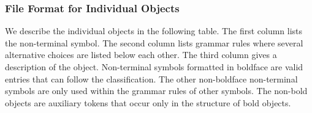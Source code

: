\subsubsection{File Format for Individual Objects\label{grammar}}

We describe the individual objects in the following table. The first
column lists the non-terminal symbol. The second column lists grammar
rules where several alternative choices are listed below each other.
The third column gives a description of the object.  Non-terminal
symbols formatted in boldface are valid  entries that can
follow the classification. The other non-boldface non-terminal symbols
are only used within the grammar rules of other symbols.  The non-bold
objects are auxiliary tokens that occur only in the structure of bold
objects. \medskip

